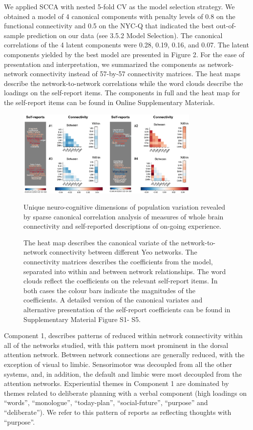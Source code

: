 We applied SCCA with nested 5-fold CV as the model selection strategy. We obtained a model of 4 canonical components with penalty levels of 0.8 on the functional connectivity and 0.5 on the NYC-Q that indicated the best out-of-sample prediction on our data (see 3.5.2 Model Selection). The canonical correlations of the 4 latent components were 0.28, 0.19, 0.16, and 0.07. The latent components yielded by the best model are presented in Figure 2. For the ease of presentation and interpretation, we summarized the components as network-network connectivity instead of 57-by-57 connectivity matrices. The heat maps describe the network-to-network correlations while the word clouds describe the loadings on the self-report items. The components in full and the heat map for the self-report items can be found in Online Supplementary Materials.

\begin{figure}
    \centering
    \includegraphics[width=0.8\textwidth]{study2/image/study2fig2.png}
    \caption{Unique neuro-cognitive dimensions of population variation revealed by sparse canonical correlation analysis of measures of whole brain connectivity and self-reported descriptions of on-going experience.}
    \caption*{
    \footnotesize{
    The heat map describes the canonical variate of the network-to-network connectivity between different Yeo networks. The connectivity matrices describes the coefficients from the model, separated into within and between network relationships. The word clouds reflect the coefficients on the relevant self-report items. In both cases the colour bars indicate the magnitudes of the coefficients. A detailed version of the canonical variates and alternative presentation of the self-report coefficients can be found in Supplementary Material Figure S1- S5.}
    }
    \label{fig:study2:fig2}
\end{figure}

Component 1, describes patterns of reduced within network connectivity within all of the networks studied, with this pattern most prominent in the dorsal attention network. Between network connections are generally reduced, with the exception of visual to limbic. Sensorimotor was decoupled from all the other systems, and, in addition, the default and limbic were most decoupled from the attention networks. Experiential themes in Component 1 are dominated by themes related to deliberate planning with a verbal component (high loadings on “words”, “monologue”, “today-plan”, “social-future”, “purpose” and “deliberate”). We refer to this pattern of reports as reflecting thoughts with “purpose”.

